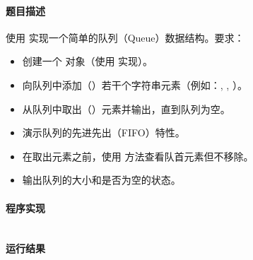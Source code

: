 \documentclass{academics}
\begin{document}
\paragraph{题目描述} {
    使用  实现一个简单的队列（Queue）数据结构。要求：
    \begin{itemize}
        \item 创建一个  对象（使用  实现）。
        \item 向队列中添加（）若干个字符串元素（例如：, , ）。
        \item 从队列中取出（）元素并输出，直到队列为空。
        \item 演示队列的先进先出（FIFO）特性。
        \item 在取出元素之前，使用  方法查看队首元素但不移除。
        \item 输出队列的大小和是否为空的状态。
    \end{itemize}
}

\paragraph{程序实现} {
    \inputminted[label=QueueDemo.java]{java}{../src/P10/QueueDemo.java}
}

\paragraph{运行结果} {
    \inputminted{text}{../res/P10.out}
}
\end{document}

